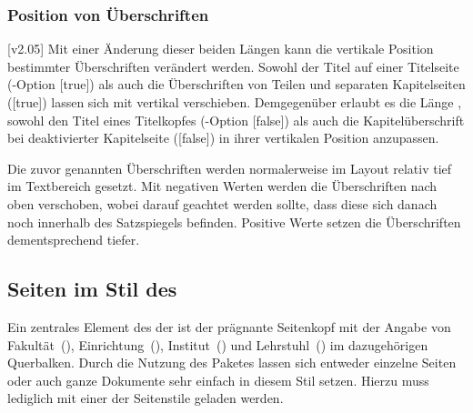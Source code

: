 \begin{Declaration*}{}
\begin{Declaration*}{}
\begin{Declaration*}{}
\subsubsection{Position von Überschriften}
\begin{Declaration}[v2.02]{}
\begin{Declaration}[v2.02]{}
\printdeclarationlist%
%
%
%
[v2.05]
Mit einer Änderung dieser beiden Längen kann die vertikale Position bestimmter
Überschriften verändert werden. Sowohl der Titel auf einer Titelseite 
(\KOMAScript-Option [true]) als auch die Überschriften von 
Teilen und separaten Kapitelseiten ([true]) lassen sich mit 
 vertikal verschieben. Demgegenüber erlaubt es die 
Länge , sowohl den Titel eines Titelkopfes 
(\KOMAScript-Option [false]) als auch die Kapitelüberschrift 
bei deaktivierter Kapitelseite ([false]) in ihrer 
vertikalen Position anzupassen.

Die zuvor genannten Überschriften werden normalerweise im Layout relativ tief 
im Textbereich gesetzt. Mit negativen Werten werden die Überschriften nach oben 
verschoben, wobei darauf geachtet werden sollte, dass diese sich danach noch 
innerhalb des Satzspiegels befinden. Positive Werte setzen die Überschriften 
dementsprechend tiefer.
\end{Declaration}
\end{Declaration}
%


\subsection{Seiten im Stil des \CDs}
\label{sec:tudheadings}
%
%
\begin{Declaration}[v2.02]{}
\begin{Declaration}[v2.02]{}
\begin{Declaration}[v2.02]{}
\printdeclarationlist%
%
Ein zentrales Element des \CDs der \TnUD ist der prägnante Seitenkopf mit der 
Angabe von Fakultät~(), Einrichtung~(), 
Institut~() und Lehrstuhl~() im dazugehörigen 
Querbalken. Durch die Nutzung des Paketes  lassen 
sich entweder einzelne Seiten oder auch ganze Dokumente sehr einfach in diesem 
Stil setzen. Hierzu muss lediglich mit  
einer der Seitenstile geladen werden. 


\end{Declaration}
\end{Declaration}
\end{Declaration}
\end{Declaration*}
\end{Declaration*}
\end{Declaration*}
